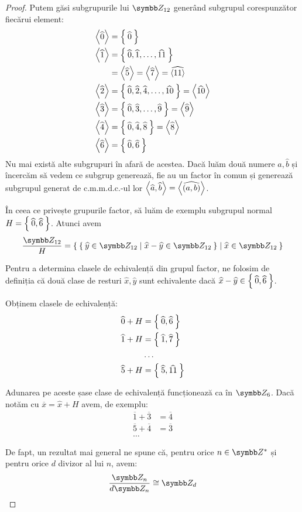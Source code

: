 \begin{proof}
Putem găsi subgrupurile lui \(\integersmod{12}\) generând subgrupul corespunzător fiecărui element:
\begin{align*}
    \left\langle \widehat{0} \right\rangle &= \Set{ \widehat{0} } \\
    \left\langle \widehat{1} \right\rangle &= \Set{ \widehat{0}, \widehat{1}, \dots, \widehat{11} } \\
    &= \left\langle \widehat{5} \right\rangle = \left\langle \widehat{7} \right\rangle = \widehat{\left\langle 11 \right\rangle} \\
    \left\langle \widehat{2} \right\rangle &= \Set{ \widehat{0}, \widehat{2}, \widehat{4}, \dots, \widehat{10} } = \left\langle \widehat{10} \right\rangle \\
    \left\langle \widehat{3} \right\rangle &= \Set{ \widehat{0}, \widehat{3}, \dots, \widehat{9} } = \left\langle \widehat{9} \right\rangle \\
    \left\langle \widehat{4} \right\rangle &= \Set{ \widehat{0}, \widehat{4}, \widehat{8} } = \left\langle \widehat{8} \right\rangle \\
    \left\langle \widehat{6} \right\rangle &= \Set{ \widehat{0}, \widehat{6} }
\end{align*}
Nu mai există alte subgrupuri în afară de acestea. Dacă luăm două numere \(\widehat{a}, \widehat{b}\) și încercăm să vedem ce subgrup generează, fie au un factor în comun și generează subgrupul generat de c.m.m.d.c.-ul lor \(\left\langle \widehat{a}, \widehat{b} \right\rangle = \left\langle \widehat{(a, b)} \right\rangle\).

În ceea ce privește grupurile factor, să luăm de exemplu subgrupul normal \(H = \Set{\widehat{0}, \widehat{6}}\). Atunci avem
\[
    \frac{\integersmod{12}}{H} = \Set{ \Set{ \widehat{y} \in \integersmod{12} | \widehat{x} - \widehat{y} \in \integersmod{12} } | \widehat{x} \in \integersmod{12} }
\]

Pentru a determina clasele de echivalență din grupul factor, ne folosim de definiția că două clase de resturi \(\widehat{x}, \widehat{y}\) sunt echivalente dacă \(\widehat{x} - \widehat{y} \in \Set{ \widehat{0}, \widehat{6} }\).

Obținem clasele de echivalență:
\begin{align*}
    \widehat{0} + H &= \Set{ \widehat{0}, \widehat{6} } \\
    \widehat{1} + H &= \Set{ \widehat{1}, \widehat{7} } \\
    &\dots \\
    \widehat{5} + H &= \Set{ \widehat{5}, \widehat{11} }
\end{align*}

Adunarea pe aceste șase clase de echivalență funcționează ca în \(\integersmod{6}\). Dacă notăm cu \(\overline{x} = \widehat{x} + H\) avem, de exemplu:
\begin{align*}
    \overline{1} + \overline{3} &= \overline{4} \\
    \overline{5} + \overline{4} &= \overline{3} \\
    \dots
\end{align*}

De fapt, un rezultat mai general ne spune că, pentru orice \(n \in \integers^*\) și pentru orice \(d\) divizor al lui \(n\), avem:
\[
    \frac{\integersmod{n}}{d \integersmod{n}} \cong \integersmod{d}
\]
\end{proof}

